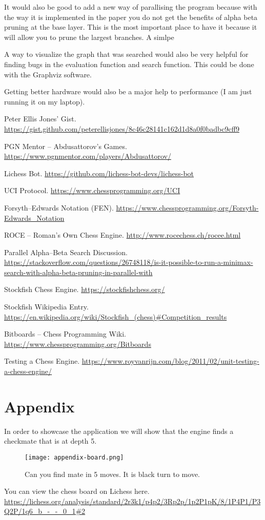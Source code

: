 \documentclass[sigconf]{acmart}
\begin{document}
It would also be good to add a new way of parallising the program because with the way it is implemented in the paper you do not get the benefits of alpha beta pruning at the base layer.
This is the most important place to have it because it will allow you to prune the largest branches.
A simlpe

A way to visualize the graph that was searched would also be very helpful for finding bugs in the evaluation function and search function.
This could be done with the Graphviz software.

Getting better hardware would also be a major help to performance (I am just running it on my laptop).

\begin{thebibliography}{99}

Peter Ellis Jones' Gist.  
\url{https://gist.github.com/peterellisjones/8c46c28141c162d1d8a0f0badbc9cff9}

PGN Mentor – Abdusattorov's Games.  
\url{https://www.pgnmentor.com/players/Abdusattorov/}

Lichess Bot.  
\url{https://github.com/lichess-bot-devs/lichess-bot}

UCI Protocol.  
\url{https://www.chessprogramming.org/UCI}

Forsyth–Edwards Notation (FEN).  
\url{https://www.chessprogramming.org/Forsyth-Edwards_Notation}

ROCE – Roman's Own Chess Engine.  
\url{http://www.rocechess.ch/rocee.html}

Parallel Alpha–Beta Search Discussion.  
\url{https://stackoverflow.com/questions/26748118/is-it-possible-to-run-a-minimax-search-with-alpha-beta-pruning-in-parallel-with}

Stockfish Chess Engine.  
\url{https://stockfishchess.org/}

Stockfish Wikipedia Entry.  
\url{https://en.wikipedia.org/wiki/Stockfish_(chess)#Competition_results}

Bitboards – Chess Programming Wiki.  
\url{https://www.chessprogramming.org/Bitboards}

Testing a Chess Engine.  
\url{https://www.royvanrijn.com/blog/2011/02/unit-testing-a-chess-engine/}

\end{thebibliography}

\section{Appendix}
In order to showcase the application we will show that the engine finds a checkmate that is at depth 5.
\begin{figure}[H]
    \centering
    \texttt{[image: appendix-board.png]}
    \caption{Can you find mate in 5 moves. It is black turn to move.}
    \label{fig:enter-label}
\end{figure}
You can view the chess board on Lichess here.
\url{https://lichess.org/analysis/standard/2r3k1/p4p2/3Rp2p/1p2P1pK/8/1P4P1/P3Q2P/1q6_b_-_-_0_1#2}
\end{document}
